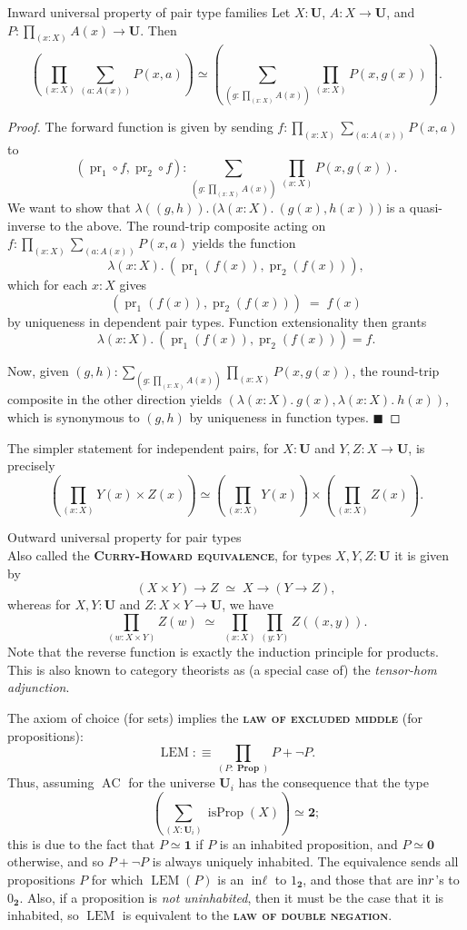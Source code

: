 \documentclass{article}
\newcommand{\defn}[1]{{\scshape\bfseries\color{MPBemph}#1}}
\renewcommand{\qed}{\hfill{\color{MPBthm}\( \blacksquare \)}}
\newcommand{\eql}{\mathbin{:\equiv}}
\newcommand{\U}{\mathbf{U}}
\newcommand{\tpi}[1]{\prod_{(#1)}}
\newcommand{\tsigma}[1]{\sum_{(#1)}}
\DeclareMathOperator{\pr}{pr}
\newcommand{\1}{\textbf{1}}
\newcommand{\0}{\mathbf{0}}
\DeclareMathOperator{\inl}{in\ell}
\DeclareMathOperator{\inr}{in\mathnormal{r}}
\newcommand{\2}{\textbf{2}}
\DeclareMathOperator{\isProp}{isProp}
\DeclareMathOperator{\Prop}{\textbf{Prop}}
\DeclareMathOperator{\AC}{AC}
\DeclareMathOperator{\LEM}{LEM}
\begin{document}
\begin{lemma}{Inward universal property of pair type families}{} Let \( X : \U \), \( A : X \to \U \), and \( P : \tpi{x : X} A(x) \to \U \). Then
\[ (\tpi{x : X} \tsigma{a : A(x)} P(x, a)) \simeq (\tsigma{g : \tpi{x : X} A(x)} \tpi{x : X} P(x, g(x))). \]
\begin{proof}
	The forward function is given by sending \( f : \tpi{x : X} \tsigma{a : A(x)} P(x, a) \) to
	\[ ({\pr_{1}} \circ f, {\pr_{2}} \circ f) : \tsigma{g : \tpi{x : X} A(x)} \tpi{x : X} P(x, g(x)). \]
	We want to show that \( \lambda((g, h)).~ \big(\lambda(x : X).~ (g(x), h(x)) \big) \) is a quasi-inverse to the above.
	The round-trip composite acting on \( f : \tpi{x : X} \tsigma{a : A(x)} P(x, a) \) yields the function
	\[ \lambda(x : X).~ (\pr_{1}(f(x)), \pr_{2}(f(x))), \]
	which for each \( x : X \) gives
	\[ (\pr_{1}(f(x)), \pr_{2}(f(x))) \;=\; f(x) \]
	by uniqueness in dependent pair types. Function extensionality then grants
	\[ \lambda(x : X).~ (\pr_{1}(f(x)), \pr_{2}(f(x))) = f. \]
	
	Now, given \( (g, h) : \tsigma{g : \tpi{x : X} A(x)} \tpi{x : X} P(x, g(x)) \), the round-trip composite in the other direction yields \( (\lambda(x : X).~g(x), \lambda(x : X).~h(x)) \), which is synonymous to \( (g, h) \) by uniqueness in function types. \qed
\end{proof} \noindent
The simpler statement for independent pairs, for \( X : \U \) and \( Y, Z : X \to \U \), is precisely
\[ (\tpi{x : X} Y(x) \times Z(x)) \simeq (\tpi{x : X} Y(x)) \times (\tpi{x : X} Z(x)). \]
\end{lemma}
\begin{example}{Outward universal property for pair types}{}~\\[3pt]
	Also called the \defn{Curry-Howard equivalence}, for types \( X, Y, Z : \U \) it is given by
	\[ (X \times Y) \to Z \;\simeq\; X \to (Y \to Z), \]
	whereas for \( X, Y : \U \) and \( Z : X \times Y \to \U \), we have
	\[ \tpi{w : X \times Y} Z(w) \;\simeq\; \tpi{x : X} \tpi{y : Y} Z((x, y)). \]
	Note that the reverse function is exactly the induction principle for products. This is also known to category theorists as (a special case of) the \emph{tensor-hom adjunction}.
\end{example}
The axiom of choice (for sets) implies the \defn{law of excluded middle} (for propositions):
\[ {\LEM} \eql \tpi{P : \Prop} P + \neg P. \]
Thus, assuming \( \AC \) for the universe \( \U_{i} \) has the consequence that the type
\[ (\tsigma{X : \U_{i}} \isProp(X)) \simeq \2; \]
this is due to the fact that \( P \simeq \1 \) if \( P \) is an inhabited proposition, and \( P \simeq \0 \) otherwise, and so \( P + \neg P \) is always uniquely inhabited. The equivalence sends all propositions \( P \) for which \( \LEM(P) \) is an \( \inl \) to \( 1_{\2} \), and those that are \( \inr \)'s to \( 0_{\2} \). Also, if a proposition is \emph{not uninhabited}, then it must be the case that it is inhabited, so \( \LEM \) is equivalent to the \defn{law of double negation}.
\end{document}
